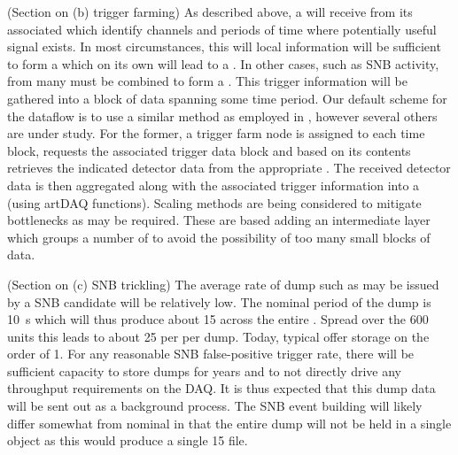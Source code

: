 (Section on (b) trigger farming) As described above, a 
will receive  from its associated 
which identify channels and periods of time where potentially useful
signal exists. 
In most circumstances, this will local information will be sufficient
to form a  which on its own will lead to a
.
In other cases, such as SNB activity,  from many
 must be combined to form a .
This trigger information will be gathered into a block of data
spanning some time period. 
Our default scheme for the dataflow is to use a similar method as
employed in , however several others are under study. 
For the former, a trigger farm node is assigned to each time block,
requests the associated trigger data block and based on its contents
retrieves the indicated detector data from the appropriate
.   
The received detector data is then aggregated along with the
associated trigger information into a  (using artDAQ
functions).
Scaling methods are being considered to mitigate bottlenecks as may be
required.  
These are based adding an intermediate layer which groups a number of
 to avoid the possibility of too many small blocks of
data.


(Section on (c) SNB trickling) The average rate of dump
 such as may be issued by a SNB candidate will be
relatively low. 
The nominal period of the dump is \SI{10}{\s} which will thus produce
about \SI{15}{\TB} across the entire  . 
Spread over the 600  units this leads to about \SI{25}{\GB}
per  per dump. 
Today, typical  offer storage on the order of \SI{1}{\TB}. 
For any reasonable SNB false-positive trigger rate, there will be
sufficient  capacity to store dumps for years and to not
directly drive any throughput requirements on the DAQ.
It is thus expected that this dump data will be sent out as a
background process. 
The SNB event building will likely differ somewhat from nominal in
that the entire dump will not be held in a single 
object as this would produce a single \SI{15}{\TB} file.


